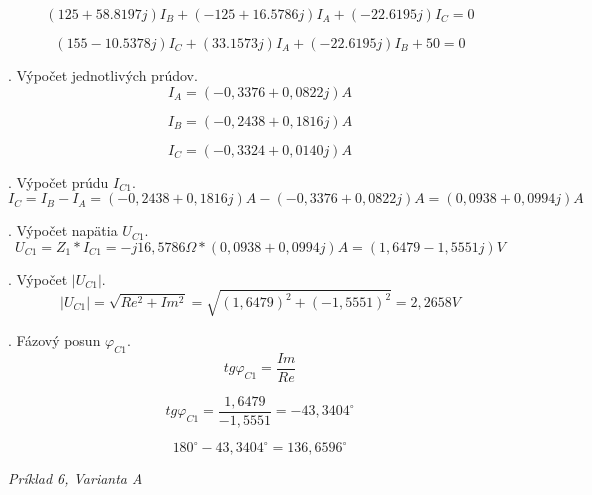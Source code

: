 \documentclass[a4paper,12pt]{article}
\begin{document}
\begin{equation}
(125 + 58.8197j)I_B+ (-125+ 16.5786j)I_A +(- 22.6195j)I_C = 0
\end{equation}

\begin{equation}
(155 - 10.5378j)I_C + (33.1573j)I_A + (-22.6195j)I_B + 50 = 0
\end{equation}

. Výpočet jednotlivých prúdov.
\begin{equation}
I_A = (-0,3376 + 0,0822j)A
\end{equation}

\begin{equation}
I_B = (-0,2438 + 0,1816j)A
\end{equation}

\begin{equation}
I_C = (-0,3324 + 0,0140j)A
\end{equation}

. Výpočet prúdu $I_{C1}$.
\begin{equation}
I_{C} = I_B - I_A = (-0,2438 + 0,1816j)A - (-0,3376 + 0,0822j)A = (0,0938 + 0,0994j)A
\end{equation}

. Výpočet napätia $U_{C1}$.
\begin{equation}
U_{C1} = Z_1 * I_{C1} = -j16,5786\Omega * (0,0938 + 0,0994j)A = (1,6479 - 1,5551j)V
\end{equation}

. Výpočet $|U_{C1}|$.
\begin{equation}
\vert U_{C1}\vert = \sqrt{Re^2 + Im^2} = \sqrt{(1,6479)^2 + (-1,5551)^2} = 2,2658V
\end{equation}

. Fázový posun $\varphi _{C1}$.
\begin{equation}
tg \varphi _{C1} = \frac{Im}{Re}
\end{equation}

\begin{equation}
tg \varphi _{C1} = \frac{1,6479}{-1,5551} = -43,3404^{\circ}
\end{equation}

\begin{equation}
180^{\circ} - 43,3404^{\circ} = 136,6596^{\circ}
\end{equation}

\newpage
\begin{center}
\emph{Príklad 6, Varianta A}
\end{center}
\end{document}
